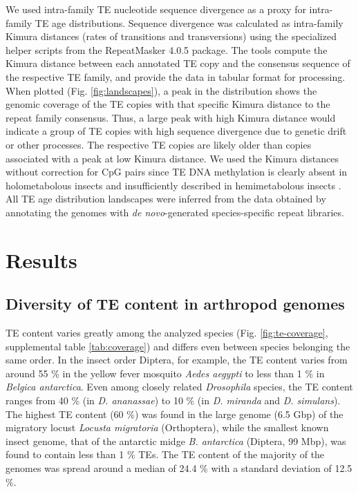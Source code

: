 We used intra-family TE nucleotide sequence divergence as a proxy for
intra-family TE age distributions. Sequence divergence was calculated as
intra-family Kimura distances (rates of transitions and transversions)
using the specialized helper scripts from the RepeatMasker 4.0.5
package. The tools compute the Kimura distance between each annotated TE
copy and the consensus sequence of the respective TE family, and provide
the data in tabular format for processing. When plotted (Fig.
\ref{fig:landscapes}), a peak in the distribution shows the genomic
coverage of the TE copies with that specific Kimura distance to the
repeat family consensus. Thus, a large peak with high Kimura distance
would indicate a group of TE copies with high sequence divergence due to
genetic drift or other processes.  The respective TE copies are likely
older than copies associated with a peak at low Kimura distance. We used
the Kimura distances without correction for CpG pairs since TE DNA
methylation is clearly absent in holometabolous insects and
insufficiently described in hemimetabolous insects \citep{Glastad2014}.
All TE age distribution landscapes were inferred from the data obtained
by annotating the genomes with \emph{de novo}-generated species-specific
repeat libraries.

\section{Results}

\subsection{Diversity of TE content in arthropod genomes}

TE content varies greatly among the analyzed species (Fig.
\ref{fig:te-coverage}, supplemental table \ref{tab:coverage}) and
differs even between species belonging the same order. In the insect
order Diptera, for example, the TE content varies from around 55 \% in
the yellow fever mosquito \emph{Aedes aegypti} to less than 1 \% in
\emph{Belgica antarctica}. Even among closely related \emph{Drosophila}
species, the TE content ranges from 40 \% (in \emph{D. ananassae}) to 10
\% (in \emph{D. miranda} and \emph{D.  simulans}). The highest TE
content (60 \%) was found in the large genome (6.5 Gbp) of the migratory
locust \emph{Locusta migratoria} (Orthoptera), while the smallest known
insect genome, that of the antarctic midge \emph{B. antarctica}
(Diptera, 99 Mbp), was found to contain less than 1 \% TEs. The TE
content of the majority of the genomes was spread around a median of
24.4 \% with a standard deviation of 12.5 \%.

